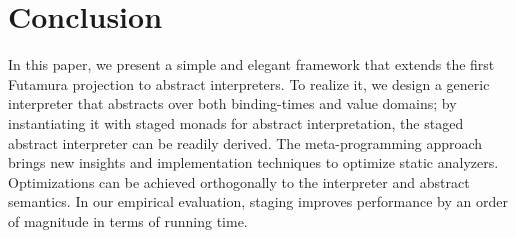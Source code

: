 \section{Conclusion}

In this paper, we present a simple and elegant framework that extends the first
Futamura projection to abstract interpreters.
To realize it, we design a generic interpreter that abstracts over both
binding-times and value domains; by instantiating it with staged monads for
abstract interpretation, the staged abstract interpreter can be readily derived.
The meta-programming approach brings new insights and implementation techniques
to optimize static analyzers. Optimizations can be achieved orthogonally to 
the interpreter and abstract semantics.  In our empirical evaluation, staging
improves performance by an order of magnitude in terms of running time.
